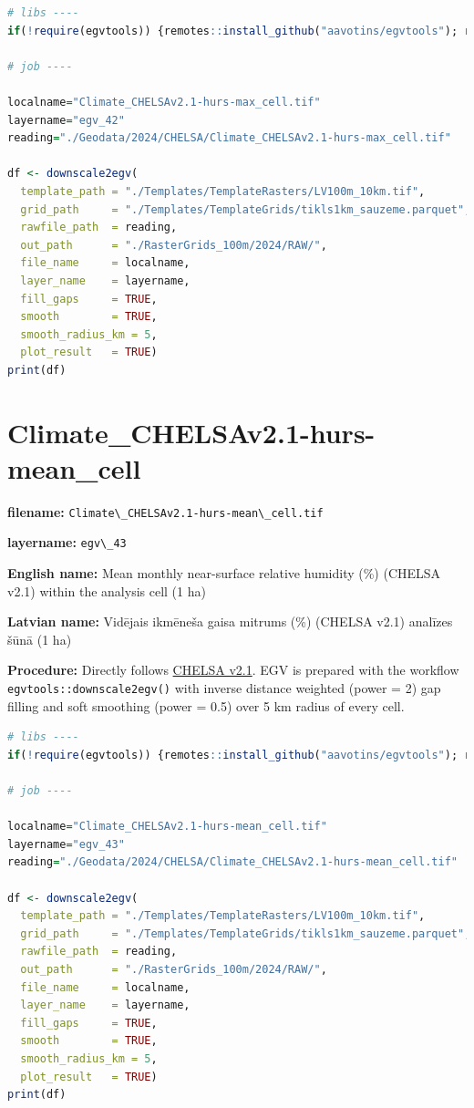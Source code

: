 \documentclass[
]{book}
\newcommand{\passthrough}[1]{#1}
\begin{document}
\begin{lstlisting}[language=R]
# libs ----
if(!require(egvtools)) {remotes::install_github("aavotins/egvtools"); require(egvtools)}

# job ----

localname="Climate_CHELSAv2.1-hurs-max_cell.tif"
layername="egv_42"
reading="./Geodata/2024/CHELSA/Climate_CHELSAv2.1-hurs-max_cell.tif"

df <- downscale2egv(
  template_path = "./Templates/TemplateRasters/LV100m_10km.tif",
  grid_path     = "./Templates/TemplateGrids/tikls1km_sauzeme.parquet",
  rawfile_path  = reading,
  out_path      = "./RasterGrids_100m/2024/RAW/",
  file_name     = localname,
  layer_name    = layername,
  fill_gaps     = TRUE,
  smooth        = TRUE,
  smooth_radius_km = 5,
  plot_result   = TRUE)
print(df)
\end{lstlisting}

\section{Climate\_CHELSAv2.1-hurs-mean\_cell}\label{ch06.043}

\textbf{filename:} \passthrough{\lstinline!Climate\_CHELSAv2.1-hurs-mean\_cell.tif!}

\textbf{layername:} \passthrough{\lstinline!egv\_43!}

\textbf{English name:} Mean monthly near-surface relative humidity (\%) (CHELSA v2.1) within the analysis cell (1 ha)

\textbf{Latvian name:} Vidējais ikmēneša gaisa mitrums (\%) (CHELSA v2.1) analīzes šūnā (1 ha)

\textbf{Procedure:} Directly follows \hyperref[Ch04.11]{CHELSA v2.1}. EGV is prepared with the
workflow \passthrough{\lstinline!egvtools::downscale2egv()!} with inverse distance weighted (power = 2)
gap filling and soft smoothing (power = 0.5) over 5 km radius of every cell.

\begin{lstlisting}[language=R]
# libs ----
if(!require(egvtools)) {remotes::install_github("aavotins/egvtools"); require(egvtools)}

# job ----

localname="Climate_CHELSAv2.1-hurs-mean_cell.tif"
layername="egv_43"
reading="./Geodata/2024/CHELSA/Climate_CHELSAv2.1-hurs-mean_cell.tif"

df <- downscale2egv(
  template_path = "./Templates/TemplateRasters/LV100m_10km.tif",
  grid_path     = "./Templates/TemplateGrids/tikls1km_sauzeme.parquet",
  rawfile_path  = reading,
  out_path      = "./RasterGrids_100m/2024/RAW/",
  file_name     = localname,
  layer_name    = layername,
  fill_gaps     = TRUE,
  smooth        = TRUE,
  smooth_radius_km = 5,
  plot_result   = TRUE)
print(df)
\end{lstlisting}
\end{document}
